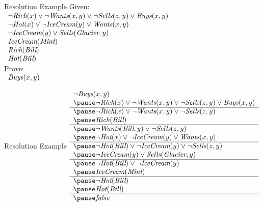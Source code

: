 \documentclass[12pt]{beamer}
\newcommand{\EM}[1]{\mbox{\em#1}}
\begin{document}
\begin{frame}{Resolution Example}
	Given:
	\\[.5em]
	$
	\begin{array}{l}
		\lnot\EM{Rich}(x) \lor \lnot\EM{Wants}(x, y) \lor \lnot\EM{Sells}(z, y) \lor \EM{Buys}(x, y) \\
		\lnot\EM{Hot}(x) \lor \lnot\EM{IceCream}(y) \lor \EM{Wants}(x, y) \\
		\lnot\EM{IceCream}(y) \lor \EM{Sells}(\EM{Glacier}, y) \\
		\EM{IceCream}(\EM{Mint}) \\
		\EM{Rich}(\EM{Bill}) \\
		\EM{Hot}(\EM{Bill})
	\end{array}
	$
	\\[1em]
	Prove:
	\\[.5em]
	$
	\begin{array}{l}
		\EM{Buys}(x, y)
	\end{array}
	$
\end{frame}
\begin{frame}{Resolution Example}
	$
	\begin{array}{l}
		\lnot\EM{Buys}(x, y) \\
		\pause
		\lnot\EM{Rich}(x) \lor \lnot\EM{Wants}(x, y) \lor \lnot\EM{Sells}(z, y) \lor \EM{Buys}(x, y) \\
		\hline
		\pause
		\lnot\EM{Rich}(x) \lor \lnot\EM{Wants}(x, y) \lor \lnot\EM{Sells}(z, y)	\\
		\pause
		\EM{Rich}(\EM{Bill}) \\
		\hline
		\pause
		\lnot\EM{Wants}(\EM{Bill}, y) \lor \lnot\EM{Sells}(z, y) \\
		\pause
		\lnot\EM{Hot}(x) \lor \lnot\EM{IceCream}(y) \lor \EM{Wants}(x, y) \\
		\hline
		\pause
		\lnot\EM{Hot}(\EM{Bill}) \lor \lnot\EM{IceCream}(y) \lor \lnot\EM{Sells}(z, y) \\
		\pause
		\lnot\EM{IceCream}(y) \lor \EM{Sells}(\EM{Glacier}, y) \\
		\hline
		\pause
		\lnot\EM{Hot}(\EM{Bill}) \lor \lnot\EM{IceCream}(y) \\
		\pause
		\EM{IceCream}(\EM{Mint}) \\
		\hline
		\pause
		\lnot\EM{Hot}(\EM{Bill}) \\
		\pause
		\EM{Hot}(\EM{Bill}) \\
		\hline
		\pause
		\EM{false}
	\end{array}
	$
\end{frame}
\end{document}
